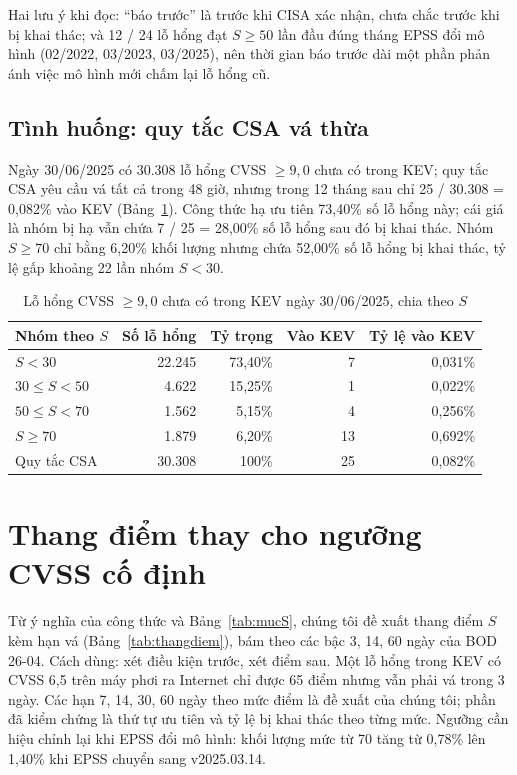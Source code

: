\documentclass[conference]{IEEEtran}
\begin{document}
Hai lưu ý khi đọc: ``báo trước'' là trước khi CISA xác nhận, chưa chắc trước khi bị khai thác; và 12 / 24 lỗ hổng đạt
$S \ge 50$ lần đầu đúng tháng EPSS đổi mô hình (02/2022, 03/2023, 03/2025), nên thời gian báo trước dài một phần phản
ánh việc mô hình mới chấm lại lỗ hổng cũ.

\subsection{Tình huống: quy tắc CSA vá thừa}
Ngày 30/06/2025 có 30.308 lỗ hổng CVSS $\ge 9{,}0$ chưa có trong KEV; quy tắc CSA yêu cầu vá tất cả trong 48 giờ,
nhưng trong 12 tháng sau chỉ 25 / 30.308 = 0,082\% vào KEV (Bảng~\ref{tab:vathua}). Công thức hạ ưu tiên 73,40\% số
lỗ hổng này; cái giá là nhóm bị hạ vẫn chứa 7 / 25 = 28,00\% số lỗ hổng sau đó bị khai thác. Nhóm $S \ge 70$ chỉ bằng
6,20\% khối lượng nhưng chứa 52,00\% số lỗ hổng bị khai thác, tỷ lệ gấp khoảng 22 lần nhóm $S < 30$.

\begin{table}[htbp]
\caption{Lỗ hổng CVSS $\ge 9{,}0$ chưa có trong KEV ngày 30/06/2025, chia theo $S$}\label{tab:vathua}
\centering
\footnotesize
\setlength{\tabcolsep}{4pt}
\begin{tabular}{lrrrr}
\toprule
Nhóm theo $S$ & Số lỗ hổng & Tỷ trọng & Vào KEV & Tỷ lệ vào KEV \\
\midrule
$S < 30$ & 22.245 & 73,40\% & 7 & 0,031\% \\
$30 \le S < 50$ & 4.622 & 15,25\% & 1 & 0,022\% \\
$50 \le S < 70$ & 1.562 & 5,15\% & 4 & 0,256\% \\
$S \ge 70$ & 1.879 & 6,20\% & 13 & 0,692\% \\
\midrule
Quy tắc CSA & 30.308 & 100\% & 25 & 0,082\% \\
\bottomrule
\end{tabular}
\end{table}

\section{Thang điểm thay cho ngưỡng CVSS cố định}\label{sec:khuyennghi}

Từ ý nghĩa của công thức và Bảng~\ref{tab:mucS}, chúng tôi đề xuất thang điểm $S$ kèm hạn vá (Bảng~\ref{tab:thangdiem}),
bám theo các bậc 3, 14, 60 ngày của BOD 26-04. Cách dùng: xét điều kiện trước, xét điểm sau. Một lỗ hổng trong KEV
có CVSS 6,5 trên máy phơi ra Internet chỉ được 65 điểm nhưng vẫn phải vá trong 3 ngày. Các hạn 7, 14, 30, 60 ngày
theo mức điểm là đề xuất của chúng tôi; phần đã kiểm chứng là thứ tự ưu tiên và tỷ lệ bị khai thác theo từng mức.
Ngưỡng cần hiệu chỉnh lại khi EPSS đổi mô hình: khối lượng mức từ 70 tăng từ 0,78\% lên 1,40\% khi EPSS chuyển sang
v2025.03.14.
\end{document}
